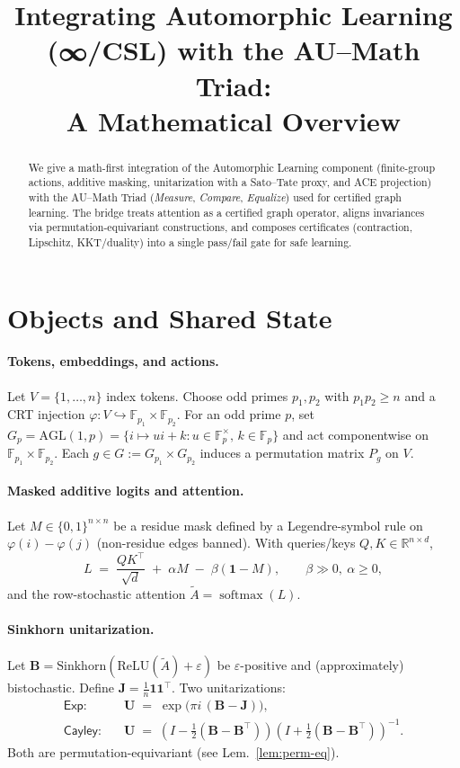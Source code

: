 \documentclass[11pt]{article}
\title{Integrating Automorphic Learning (∞/CSL) with the AU--Math Triad:\\
A Mathematical Overview}
\author{}
\date{}
\newcommand{\R}{\mathbb{R}}
\newcommand{\F}{\mathbb{F}}
\newcommand{\one}{\mathbf{1}}
\newcommand{\Id}{I}
\newcommand{\softmax}{\operatorname{softmax}}
\newcommand{\bJ}{\mathbf{J}}
\newcommand{\bB}{\mathbf{B}}
\newcommand{\bU}{\mathbf{U}}
\begin{document}
\maketitle

\begin{abstract}
We give a math-first integration of the Automorphic Learning component (finite-group actions, additive masking, unitarization with a Sato--Tate proxy, and ACE projection) with the AU--Math Triad (\emph{Measure}, \emph{Compare}, \emph{Equalize}) used for certified graph learning. The bridge treats attention as a certified graph operator, aligns invariances via permutation-equivariant constructions, and composes certificates (contraction, Lipschitz, KKT/duality) into a single pass/fail gate for safe learning.
\end{abstract}

\section{Objects and Shared State}
\paragraph{Tokens, embeddings, and actions.}
Let $V=\{1,\dots,n\}$ index tokens. Choose odd primes $p_1,p_2$ with $p_1p_2\ge n$ and a CRT injection
$\varphi:V\hookrightarrow \F_{p_1}\times \F_{p_2}$. For an odd prime $p$, set $G_p=\mathrm{AGL}(1,p)=\{i\mapsto u i + k: u\in \F_p^\times,\,k\in\F_p\}$ and act componentwise on $\F_{p_1}\times \F_{p_2}$. Each $g\in G:=G_{p_1}\times G_{p_2}$ induces a permutation matrix $P_g$ on $V$.

\paragraph{Masked additive logits and attention.}
Let $M\in\{0,1\}^{n\times n}$ be a residue mask defined by a Legendre-symbol rule on $\varphi(i)-\varphi(j)$ (non-residue edges banned). With queries/keys $Q,K\in\R^{n\times d}$,
\begin{equation}\label{eq:additive-logits}
L \;=\; \frac{QK^\top}{\sqrt{d}} \;+\; \alpha M\;-\;\beta(\mathbf{1}-M),\qquad \beta\gg 0,\ \alpha\ge 0,
\end{equation}
and the row-stochastic attention $\tilde A=\softmax(L)$.

\paragraph{Sinkhorn unitarization.}
Let $\bB=\mathrm{Sinkhorn}(\mathrm{ReLU}(\tilde A)+\varepsilon)$ be $\varepsilon$-positive and (approximately) bistochastic. Define $\bJ=\frac{1}{n}\one\one^\top$. Two unitarizations:
\begin{align}
\textsf{Exp:}\quad & \bU \;=\; \exp\big(\pi i\, (\bB-\bJ)\big),\\
\textsf{Cayley:}\quad & \bU \;=\; (\Id-\tfrac12(\bB-\bB^\top))(\Id+\tfrac12(\bB-\bB^\top))^{-1}.
\end{align}
Both are permutation-equivariant (see Lem.~\ref{lem:perm-eq}).
\end{document}
